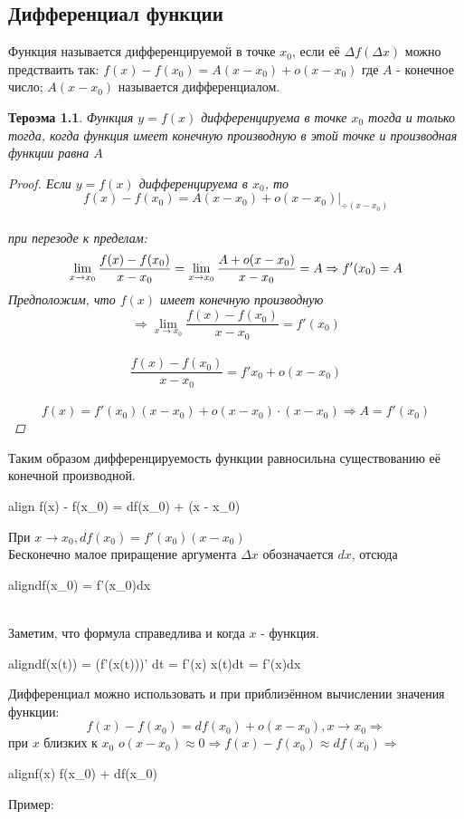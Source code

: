 \documentclass[oneside]{book}
\newcommand{\boxedeq}[2]{\begin{empheq}[box={\fboxsep=6pt\fbox}]{align}\label{#1}#2\end{empheq}}
\newtheorem{thm}{Тероэма}[chapter] %
\begin{document}
\begin{enumerate}
\begin{itemize}
    \setcounter{chapter}{19}
    \chapter{Дифференциал функции}

Функция называется дифференцируемой в точке $x_0$, если её $\Delta f(\Delta x)$ можно предстваить так:
$f(x) - f(x_0) = A(x - x_0) + o(x - x_0)$ где $A$ - конечное число; $A(x - x_0)$ называется дифференциалом.
\begin{thm}
    Функция $y = f(x)$ дифференцируема в точке $x_0$ тогда и только тогда, когда функция имеет конечную производную в этой точке
    и производная функции равна $A$
    \begin{proof}
      Если $y = f(x)$ дифференцируема в $x_0$, то
      $$f(x) - f(x_0) = A(x-x_0) + o(x - x_0)\vert_{\div (x - x_0)}$$ \\
      при перезоде к пределам:
      $$\lim_{x \rightarrow x_0}{\frac{f(x) - f(x_0)}{x - x_0}} = \lim_{x \rightarrow x_0}{\frac{A+o(x-x_0)}{x-x_0}} = \large{A} \Rightarrow f'(x_0) = A$$
		Предположим, что $f(x)$ имеет конечную производную $$ \Rightarrow \lim_{x \rightarrow x_0}{\frac{f(x) - f(x_0)}{x - x_0}} =
		f'(x_0)$$ \\
		$$\frac{f(x) - f(x_0)}{x - x_0} = f'{x_0} + o(x-x_0)$$ \\ $$
		f(x) = f'(x_0)(x - x_0) + o(x-x_0) \cdot (x-x_0) \Rightarrow A = f'(x_0)$$
    \end{proof}
\end{thm}
Таким образом дифференцируемость функции равносильна существованию её конечной производной.
\boxedeq{eq:*}{ f(x) - f(x_0) = df(x_0) + (x - x_0)}
При $x \rightarrow x_0, df(x_0) = f'(x_0)(x - x_0)$ \\
Бесконечно малое приращение аргумента $\Delta x$ обозначается $dx$, отсюда
\boxedeq{eq:*}{df(x_0) = f'(x_0)dx} \\

Заметим, что формула справедлива и когда $x$ - функция.
\boxedeq{eq:*}{df(x(t)) = (f'(x(t)))' dt = f'(x) \cdot x(t)dt = f'(x)dx}

Дифференциал можно использовать и при приблиэённом вычислении значения функции:\\
$$f(x) - f(x_0) = df(x_0) + o(x - x_0), x \rightarrow x_0 \Rightarrow$$ при $x$ близких к $x_0$
$o(x- x_0) \approx 0 \Rightarrow f(x) - f(x_0) \approx df(x_0) \Rightarrow$ \\
\boxedeq{eq:*}{f(x) \approx f(x_0) + df(x_0)}
\begin{center}
  Пример:
\end{center}


\end{itemize}
\end{enumerate}
\end{document}
